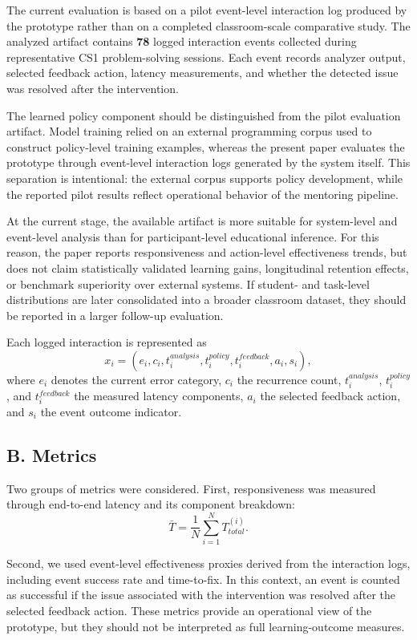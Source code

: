 \documentclass[conference]{IEEEtran}
\begin{document}
The current evaluation is based on a pilot event-level interaction log produced by the prototype rather than on a completed classroom-scale comparative study. The analyzed artifact contains \textbf{78} logged interaction events collected during representative CS1 problem-solving sessions. Each event records analyzer output, selected feedback action, latency measurements, and whether the detected issue was resolved after the intervention.

The learned policy component should be distinguished from the pilot evaluation artifact. Model training relied on an external programming corpus used to construct policy-level training examples, whereas the present paper evaluates the prototype through event-level interaction logs generated by the system itself. This separation is intentional: the external corpus supports policy development, while the reported pilot results reflect operational behavior of the mentoring pipeline.

At the current stage, the available artifact is more suitable for system-level and event-level analysis than for participant-level educational inference. For this reason, the paper reports responsiveness and action-level effectiveness trends, but does not claim statistically validated learning gains, longitudinal retention effects, or benchmark superiority over external systems. If student- and task-level distributions are later consolidated into a broader classroom dataset, they should be reported in a larger follow-up evaluation.

Each logged interaction is represented as
\[
x_i = (e_i, c_i, t^{analysis}_i, t^{policy}_i, t^{feedback}_i, a_i, s_i),
\]
where $e_i$ denotes the current error category, $c_i$ the recurrence count, $t^{analysis}_i$, $t^{policy}_i$, and $t^{feedback}_i$ the measured latency components, $a_i$ the selected feedback action, and $s_i$ the event outcome indicator.


\subsection*{B. Metrics}

Two groups of metrics were considered. First, responsiveness was measured through end-to-end latency and its component breakdown:
\[
\bar{T} = \frac{1}{N} \sum_{i=1}^{N} T_{total}^{(i)}.
\]

Second, we used event-level effectiveness proxies derived from the interaction logs, including event success rate and time-to-fix. In this context, an event is counted as successful if the issue associated with the intervention was resolved after the selected feedback action. These metrics provide an operational view of the prototype, but they should not be interpreted as full learning-outcome measures.
\end{document}
